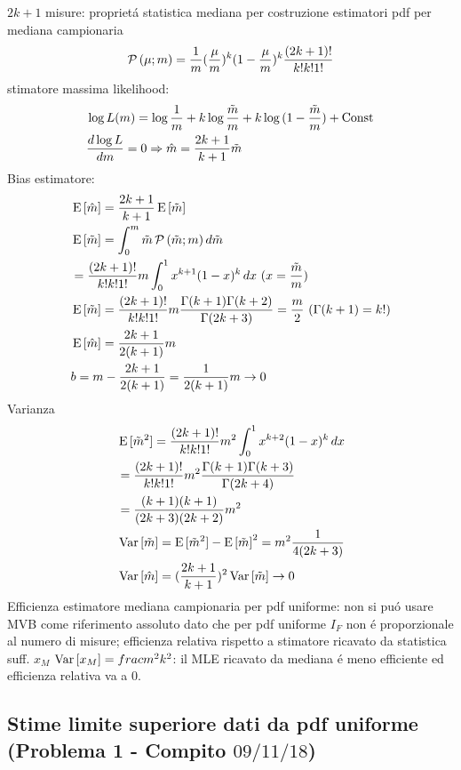 \begin{frame}{$2k+1$ misure: propriet\'a statistica mediana per costruzione estimatori}
pdf per mediana campionaria
\begin{equation*}	\prob{(\mu;m)}=\frac{1}{m}(\frac{\mu}{m})^k(1-\frac{\mu}{m})^k\frac{(2k+1)!}{k!k!1!}
\end{equation*}
stimatore massima likelihood:
\begin{align*}
&\log{L(m)}=\log{\frac{1}{m}}+k\log{\frac{\tilde{m}}{m}}+k\log{(1-\frac{\tilde{m}}{m})}+\const{}\\
&\TDy{m}{\log{L}}=0 \Rightarrow \hat{m}=\frac{2k+1}{k+1}\tilde{m}
\end{align*}
Bias estimatore:
\begin{align*}
&\E{[\hat{m}]}=\frac{2k+1}{k+1}\E{[\tilde{m}]}\\
&\E{[\tilde{m}]}=\int_0^m\tilde{m}\prob{(\tilde{m};m)}\,d\tilde{m}\\
&=\frac{(2k+1)!}{k!k!1!}m\int_0^1x^{k+1}(1-x)^k\,dx\ (x=\frac{\tilde{m}}{m})\\
&\E{[\tilde{m}]}=\frac{(2k+1)!}{k!k!1!}m\frac{\Gamma(k+1)\Gamma(k+2)}{\Gamma(2k+3)}=\frac{m}{2}\ (\Gamma(k+1)=k!)\\
&\E{[\hat{m}]}=\frac{2k+1}{2(k+1)}m\\
&b=m-\frac{2k+1}{2(k+1)}=\frac{1}{2(k+1)}m\to0
\end{align*}
Varianza
\begin{align*}
&\E{[\tilde{m}^2]}=\frac{(2k+1)!}{k!k!1!}m^2\int_0^1x^{k+2}(1-x)^k\,dx\\
&=\frac{(2k+1)!}{k!k!1!}m^2\frac{\Gamma(k+1)\Gamma(k+3)}{\Gamma(2k+4)}\\
&=\frac{(k+1)(k+1)}{(2k+3)(2k+2)}m^2\\
&\var{[\tilde{m}]}=\E{[\tilde{m}^2]}-\E{[\tilde{m}]}^2=m^2\frac{1}{4(2k+3)}\\
&\var{[\hat{m}]}=(\frac{2k+1}{k+1})^2\var{[\tilde{m}]}\to0
\end{align*}
Efficienza estimatore mediana campionaria per pdf uniforme: non si pu\'o usare MVB come riferimento assoluto dato che per pdf uniforme $I_F$ non \'e proporzionale al numero di misure; efficienza relativa rispetto a stimatore ricavato da statistica suff. $x_M$ $\var{[x_M]}=frac{m^2}{k^2}$: il MLE ricavato da mediana \'e meno efficiente ed efficienza relativa va a 0.
\end{frame}

\subsection{Stime limite superiore dati da pdf uniforme (Problema 1 - Compito $09/11/18$)}

